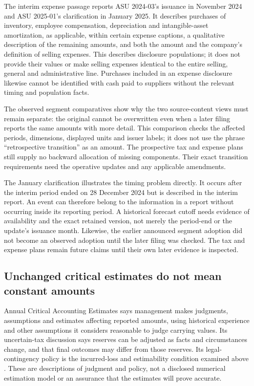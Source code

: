 The interim expense passage reports ASU 2024-03's issuance in November 2024
and ASU 2025-01's clarification in January 2025. It describes purchases of
inventory, employee compensation, depreciation and intangible-asset amortization,
as applicable, within certain expense captions, a qualitative description of
the remaining amounts, and both the amount and the company's definition of
selling expenses. This describes disclosure populations; it does not provide
their values or make selling expenses identical to the entire selling, general
and administrative line. Purchases included in an expense disclosure likewise
cannot be identified with cash paid to suppliers without the relevant timing
and population facts.

The observed segment comparatives show why the two source-content views must
remain separate: the original cannot be overwritten even when a later filing
reports the same amounts with more detail. This comparison checks the affected
periods, dimensions, displayed units and issuer labels; it does not use the
phrase ``retrospective transition'' as an amount. The prospective tax and
expense plans still supply no backward allocation of missing components.
Their exact transition requirements need the operative updates and any
applicable amendments.

The January clarification illustrates the timing problem directly. It occurs
after the interim period ended on 28 December 2024 but is described in the
interim report. An event can therefore belong to the information in a report
without occurring inside its reporting period. A historical forecast cutoff
needs evidence of availability and the exact retained version, not merely the
period-end or the update's issuance month. Likewise, the earlier announced
segment adoption did not become an observed adoption until the later filing
was checked. The tax and expense plans remain future claims until their own
later evidence is inspected.

\subsection{Unchanged critical estimates do not mean constant amounts}

Annual Critical Accounting Estimates says management makes judgments,
assumptions and estimates affecting reported amounts, using historical
experience and other assumptions it considers reasonable to judge carrying
values. Its uncertain-tax discussion says reserves can be adjusted as facts
and circumstances change, and that final outcomes may differ from those
reserves. Its legal-contingency policy is the incurred-loss and estimability
condition examined above \citep[Critical Accounting Estimates, printed p.~26]{apple2024}.
These are descriptions of judgment and policy, not a disclosed numerical
estimation model or an assurance that the estimates will prove accurate.

